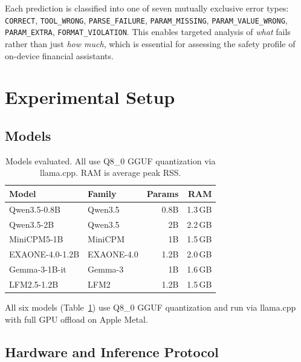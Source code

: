 \documentclass[11pt,twocolumn]{article}
\begin{document}
Each prediction is classified into one of seven mutually exclusive error types:
\texttt{CORRECT}, \texttt{TOOL\_WRONG}, \texttt{PARSE\_FAILURE}, \texttt{PARAM\_MISSING}, \texttt{PARAM\_VALUE\_WRONG}, \texttt{PARAM\_EXTRA}, \texttt{FORMAT\_VIOLATION}.
This enables targeted analysis of \emph{what} fails rather than just \emph{how much}, which is essential for assessing the safety profile of on-device financial assistants.

\section{Experimental Setup}

\subsection{Models}

\begin{table}[t]
\centering
\footnotesize
\setlength{\tabcolsep}{4pt}
\begin{tabular}{@{}p{2.8cm}p{2.0cm}rr@{}}
\toprule
\textbf{Model} & \textbf{Family} & \textbf{Params} & \textbf{RAM} \\
\midrule
Qwen3.5-0.8B    & Qwen3.5 \citeyearpar{qwen2025qwen3}    & 0.8B & 1.3\,GB \\
Qwen3.5-2B      & Qwen3.5 \citeyearpar{qwen2025qwen3}    & 2B   & 2.2\,GB \\
MiniCPM5-1B     & MiniCPM \citeyearpar{minicpm2024}       & 1B   & 1.5\,GB \\
EXAONE-4.0-1.2B & EXAONE-4.0 \citeyearpar{lgai2025exaone} & 1.2B & 2.0\,GB \\
Gemma-3-1B-it   & Gemma-3 \citeyearpar{team2025gemma}     & 1B   & 1.6\,GB \\
LFM2.5-1.2B     & LFM2 \citeyearpar{liquidai2025lfm2}     & 1.2B & 1.5\,GB \\
\bottomrule
\end{tabular}
\caption{Models evaluated. All use Q8\_0 GGUF quantization via llama.cpp. RAM is average peak RSS.}
\label{tab:models}
\end{table}

All six models (Table~\ref{tab:models}) use Q8\_0 GGUF quantization and run via llama.cpp \citep{llamacpp2023} with full GPU offload on Apple Metal.

\subsection{Hardware and Inference Protocol}
\end{document}
